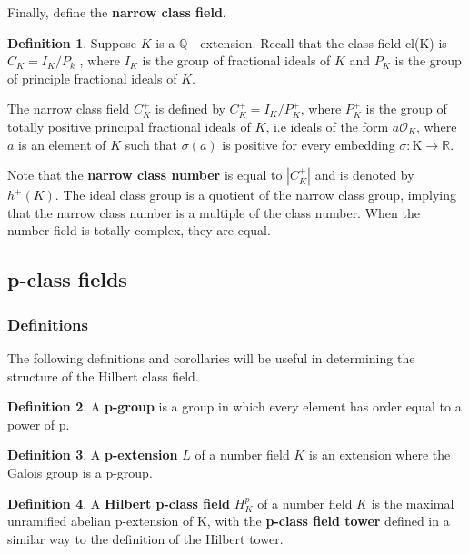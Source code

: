 \documentclass[12pt]{extarticle}
\newcommand{\R}{\mathbb{R}}
\newcommand{\Q}{\mathbb{Q}}
\newcommand{\<}{\langle}
\renewcommand{\>}{\rangle}
\theoremstyle{definition}
\newtheorem*{definition}{Definition}
\begin{document}
Finally, define the \textbf{narrow class field}.
\begin{definition}
Suppose $K$ is a $\Q$ - extension. Recall that the class field cl(K) is $C_K = I_K/P_k$ , where $I_K$ is the group of fractional ideals of $K$ and $P_K$ is the group of principle fractional ideals of $K$. \par

The narrow class field $C_K^{+}$ is defined by $C_K^{+} = I_K/P_K^{+}$, where $P_K^{+}$ is the group of totally positive principal fractional ideals of $K$, i.e ideals of the form $a\mathcal{O}_K$, where $a$ is an element of $K$ such that $\sigma(a)$ is positive for every embedding $\sigma: $K$ \rightarrow \R$. \par
Note that the \textbf{narrow class number} is equal to $|C_K^{+}|$ and is denoted by $h^{+}(K)$. 
  The ideal class group is a quotient of the narrow class group, implying that the narrow class number is a multiple of the class number. When the number field is totally complex, they are equal. 


\end{definition}
\subsection{p-class fields}
\subsubsection*{Definitions}
The following definitions and corollaries will be useful in determining the structure of the Hilbert class field. 
\begin{definition}
A \textbf{p-group} is a group in which every element has order equal to a power of p.
\end{definition}
\begin{definition}
A \textbf{p-extension} $L$ of a number field $K$ is an extension where the Galois group is a p-group.
\end{definition}

\begin{definition}
A \textbf{Hilbert p-class field} $H_K^{p}$ of a number field $K$ is the maximal unramified abelian p-extension of K, with the \textbf{p-class field tower} defined in a similar way to the definition of the Hilbert tower. 
\end{definition}
\end{document}
